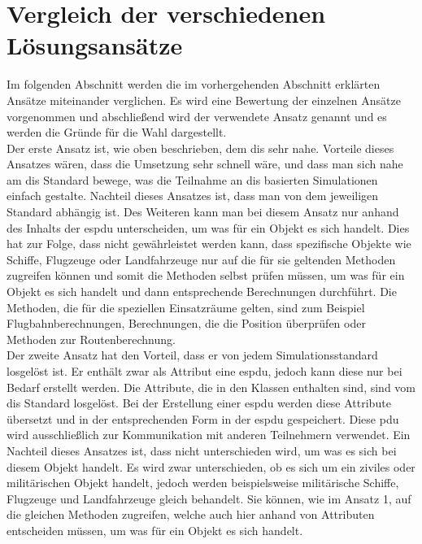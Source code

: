 \section{Vergleich der verschiedenen Lösungsansätze} 
Im folgenden Abschnitt werden die im vorhergehenden Abschnitt erklärten Ansätze miteinander verglichen. Es wird eine Bewertung der einzelnen Ansätze vorgenommen und abschließend wird der verwendete Ansatz genannt und es werden die Gründe für die Wahl dargestellt.\\
Der erste Ansatz ist, wie oben beschrieben, dem \ac{dis} sehr nahe. Vorteile dieses Ansatzes wären, dass die Umsetzung sehr schnell wäre, und dass man sich nahe am \ac{dis} Standard bewege, was die Teilnahme an \ac{dis} basierten Simulationen einfach gestalte. Nachteil dieses Ansatzes ist, dass man von dem jeweiligen Standard abhängig ist. Des Weiteren kann man bei diesem Ansatz nur anhand des Inhalts der \ac{espdu} unterscheiden, um was für ein Objekt es sich handelt. Dies hat zur Folge, dass nicht gewährleistet werden kann, dass  spezifische Objekte wie Schiffe, Flugzeuge oder Landfahrzeuge nur auf die für sie geltenden Methoden zugreifen können und somit die Methoden selbst prüfen müssen, um was für ein Objekt es sich handelt und dann entsprechende Berechnungen durchführt. Die Methoden, die für die speziellen Einsatzräume gelten, sind zum Beispiel Flugbahnberechnungen, Berechnungen, die die Position überprüfen oder Methoden zur Routenberechnung.    \\
Der zweite  Ansatz hat den Vorteil, dass er von jedem Simulationsstandard losgelöst ist. Er enthält zwar als Attribut eine \ac{espdu}, jedoch kann diese nur bei Bedarf erstellt werden. Die Attribute, die in den Klassen enthalten sind, sind vom \ac{dis} Standard losgelöst. Bei der Erstellung  einer  \ac{espdu} werden diese Attribute übersetzt und in der entsprechenden Form in der \ac{espdu} gespeichert. Diese \ac{pdu} wird ausschließlich zur Kommunikation mit anderen Teilnehmern verwendet. Ein Nachteil dieses Ansatzes ist, dass nicht unterschieden wird, um was es sich bei diesem Objekt handelt. Es wird zwar unterschieden, ob es sich um ein ziviles oder militärischen Objekt handelt, jedoch werden beispielsweise militärische Schiffe, Flugzeuge und Landfahrzeuge gleich behandelt. Sie können, wie im Ansatz 1, auf die gleichen Methoden zugreifen, welche auch hier anhand von Attributen entscheiden müssen, um was für ein Objekt es sich handelt. \\
